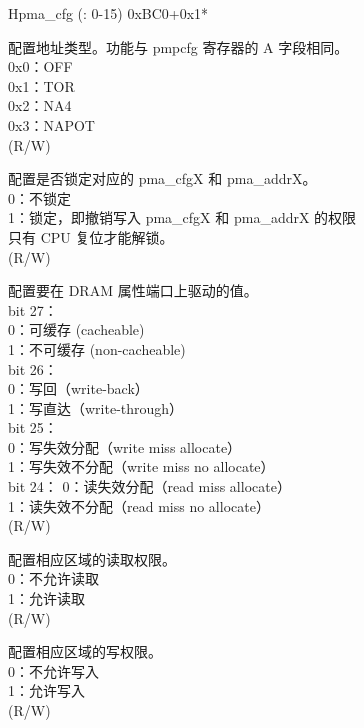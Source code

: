 \begin{register}{H}{pma\_cfg (: 0-15)} {0xBC0+0x1*}
\label{regdesc:pma_cfgX}
%
%
%
%
%
%
%
%
%
%
\regnewline%
\begin{regdesc}
\begin{reglist}
\label{fielddesc:A}\item [A] 配置地址类型。功能与 pmpcfg 寄存器的 A 字段相同。\\
0x0：OFF\\
0x1：TOR\\
0x2：NA4\\
0x3：NAPOT\\
(R/W)
\label{fielddesc:LOCK}\item [LOCK] 配置是否锁定对应的 pma\_cfgX 和 pma\_addrX。\\
0：不锁定\\
1：锁定，即撤销写入 pma\_cfgX 和 pma\_addrX 的权限\\
只有 CPU 复位才能解锁。\\
(R/W)
\label{fielddesc:ATTRIBUTE}\item [ATTRIBUTE] 配置要在 DRAM 属性端口上驱动的值。\\
bit 27： \\
0：可缓存 (cacheable)\\
1：不可缓存 (non-cacheable)\\
bit 26：\\
0：写回（write-back）\\
1：写直达（write-through）\\
bit 25：\\
0：写失效分配（write miss allocate）\\
1：写失效不分配（write miss no allocate）\\
bit 24：
0：读失效分配（read miss allocate）\\
1：读失效不分配（read miss no allocate）\\
(R/W)
\label{fielddesc:READ}\item [READ] 配置相应区域的读取权限。\\
0：不允许读取\\
1：允许读取\\
 (R/W)
\label{fielddesc:WRITE}\item [WRITE] 配置相应区域的写权限。\\
0：不允许写入\\
1：允许写入\\
(R/W)
\item [见下页……]
\end{reglist}\end{regdesc}
\end{register}
